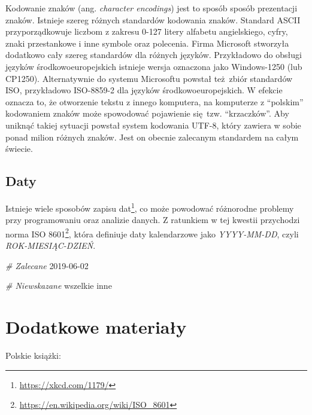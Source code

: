 \documentclass[paper=6in:9in,pagesize=pdftex,headinclude=on,footinclude=on,10pt]{scrbook}
\makeatletter
\newenvironment{Shaded}{\begin{snugshade}}{\end{snugshade}}
\newcommand{\CommentTok}[1]{\textcolor[rgb]{0.56,0.35,0.01}{\textit{#1}}}
\newcommand{\DecValTok}[1]{\textcolor[rgb]{0.00,0.00,0.81}{#1}}
\newcommand{\NormalTok}[1]{#1}
\DeclareRobustCommand{\href}[2]{#2\footnote{\url{#1}}}
\newenvironment{kframe}{%
\medskip{}
\setlength{\fboxsep}{.8em}
 \def\at@end@of@kframe{}%
 \ifinner\ifhmode%
  \def\at@end@of@kframe{\end{minipage}}%
  \begin{minipage}{\columnwidth}%
 \fi\fi%
 \def\FrameCommand##1{\hskip\@totalleftmargin \hskip-\fboxsep
 \colorbox{shadecolor}{##1}\hskip-\fboxsep
     \hskip-\linewidth \hskip-\@totalleftmargin \hskip\columnwidth}%
 \MakeFramed {\advance\hsize-\width
   \@totalleftmargin\z@ \linewidth\hsize
   \@setminipage}}%
 {\par\unskip\endMakeFramed%
 \at@end@of@kframe}
\newenvironment{rmdblock}[1]
  {
  \begin{itemize}
  \renewcommand{\labelitemi}{
    \raisebox{-.7\height}[0pt][0pt]{
      {\setkeys{Gin}{width=3em,keepaspectratio}\texttt{[image: images/\#1]}}
    }
  }
  \setlength{\fboxsep}{1em}
  \begin{kframe}
  \item
  }
  {
  \end{kframe}
  \end{itemize}
  }
\newenvironment{rmdinfo}
  {\begin{rmdblock}{compass}}
  {\end{rmdblock}}
\makeatother
\begin{document}
\begin{rmdinfo}
Kodowanie znaków (ang. \emph{character encodings}) jest to sposób sposób prezentacji znaków.
Istnieje szereg różnych standardów kodowania znaków.
Standard ASCII przyporządkowuje liczbom z zakresu 0-127 litery alfabetu angielskiego, cyfry, znaki przestankowe i inne symbole oraz polecenia.
Firma Microsoft stworzyła dodatkowo cały szereg standardów dla różnych języków.
Przykładowo do obsługi języków środkowoeuropejskich istnieje wersja oznaczona jako Windows-1250 (lub CP1250).
Alternatywnie do systemu Microsoftu powstał też~zbiór standardów ISO, przykładowo ISO-8859-2 dla języków środkowoeuropejskich.
W efekcie oznacza to, że otworzenie tekstu z innego komputera, na komputerze z ``polskim'' kodowaniem znaków może spowodować pojawienie się~tzw. ``krzaczków''.
Aby uniknąć takiej sytuacji powstał system kodowania UTF-8, który zawiera w sobie ponad milion różnych znaków.
Jest on obecnie zalecanym standardem na całym świecie.
\end{rmdinfo}

\hypertarget{daty}{%
\subsection{Daty}\label{daty}}

Istnieje wiele sposobów zapisu dat\footnote{\url{https://xkcd.com/1179/}}, co może powodować różnorodne problemy przy programowaniu oraz analizie danych.
Z ratunkiem w tej kwestii przychodzi norma \href{https://en.wikipedia.org/wiki/ISO_8601}{ISO 8601}, która definiuje daty kalendarzowe jako \emph{YYYY-MM-DD}, czyli \emph{ROK-MIESIĄC-DZIEŃ}.

\begin{Shaded}
\begin{Highlighting}[]
\CommentTok{# Zalecane}
\DecValTok{2019-06-02}

\CommentTok{# Niewskazane}
\NormalTok{wszelkie inne}
\end{Highlighting}
\end{Shaded}

\hypertarget{resources}{%
\section{Dodatkowe materiały}\label{resources}}

Polskie książki:
\end{document}
